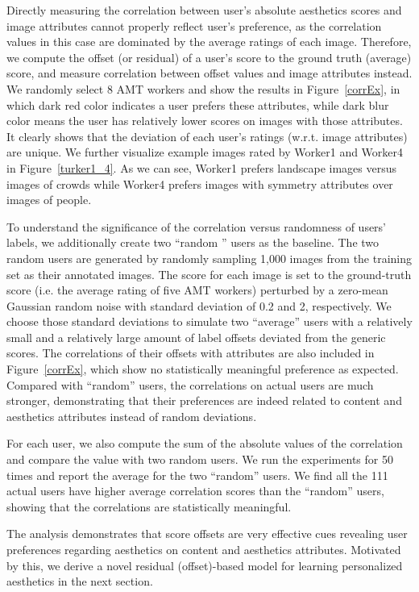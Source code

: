 Directly measuring the correlation between user's absolute aesthetics scores and image attributes cannot properly reflect user's preference, as the correlation values in this case are dominated by the average ratings of each image. Therefore, we compute the offset (or residual) of a user's score to the ground truth (average) score, and measure correlation between offset values and image attributes instead. We randomly select 8 AMT workers and show the results in Figure~\ref{corrEx}, in which dark red color indicates a user prefers these attributes, while dark blur color means the user has relatively lower scores on images with those attributes. It clearly shows that the deviation of each user's ratings (w.r.t. image attributes) are unique. We further visualize example images rated by Worker1 and Worker4 in Figure~\ref{turker1_4}. As we can see, Worker1 prefers landscape images versus images of crowds while Worker4 prefers images with symmetry attributes over images of people. 

To understand the significance of the correlation versus randomness of users' labels, we additionally create two ``random '' users as the baseline. The two random users are generated by randomly sampling 1,000 images from the training set as their annotated images. The score for each image is set to the ground-truth score (i.e. the average rating of five AMT workers) perturbed by a zero-mean Gaussian random noise with standard deviation of 0.2 and 2, respectively. We choose those standard deviations to simulate two ``average'' users with a relatively small and a relatively large amount of label offsets deviated from the generic scores.
The correlations of their offsets with attributes are also included in Figure~\ref{corrEx}, which show no statistically meaningful preference as expected. Compared with ``random'' users, the correlations on actual users are much stronger, demonstrating that their preferences are indeed related to content and aesthetics attributes instead of random deviations.

For each user, we also compute the sum of the absolute values of the correlation and compare the value with two random users. We run the experiments for 50 times and report the average for the two ``random'' users. We find all the 111 actual users have higher average correlation scores than the ``random'' users, showing that the correlations are statistically meaningful. 

The analysis demonstrates that score offsets are very effective cues revealing user preferences regarding aesthetics on content and aesthetics attributes. Motivated by this, we derive a novel residual (offset)-based model for learning personalized aesthetics in the next section. 

